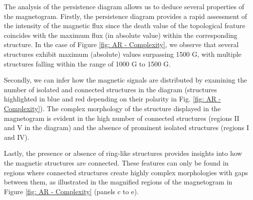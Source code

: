 The analysis of the persistence diagram allows us to deduce several properties of the magnetogram. Firstly, the persistence diagram provides a rapid assessment of the intensity of the magnetic flux since the death value of the topological feature coincides with the maximum flux (in absolute value) within the corresponding structure. In the case of Figure \ref{fig:  AR - Complexity}, we observe that several structures exhibit maximum (absolute) values surpassing 1500 G, with multiple structures falling within the range of 1000 G to 1500 G.

Secondly, we can infer how the magnetic signals are distributed by examining the number of isolated and connected structures in the diagram (structures highlighted in blue and red depending on their polarity in Fig. \ref{fig:  AR - Complexity}). The complex morphology of the structure displayed in the magnetogram is evident in the high number of connected structures (regions II and V in the diagram) and the absence of prominent isolated structures (regions I and IV).

Lastly, the presence or absence of ring-like structures provides insights into how the magnetic structures are connected. These features can only be found in regions where connected structures create highly complex morphologies with gaps between them, as illustrated in the magnified regions of the magnetogram in Figure \ref{fig:  AR - Complexity} (panels c to e).

